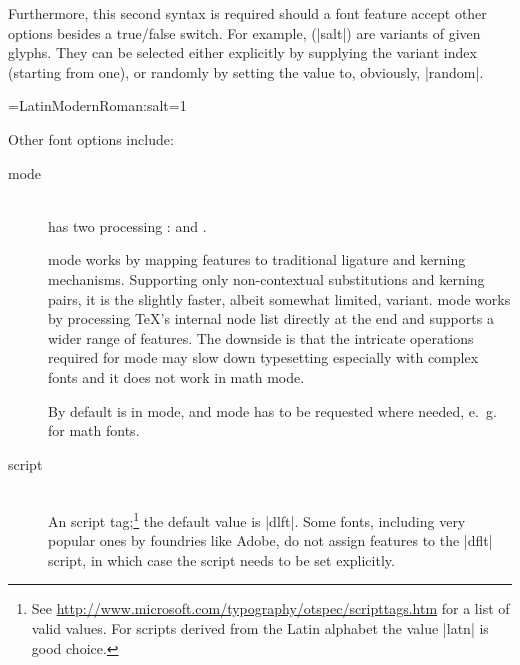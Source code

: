 \noindent
Furthermore, this second syntax is required should a font feature
accept other options besides a true/false switch.
%
For example,  (|salt|) are variants of
given glyphs.
%
They can be selected either explicitly by supplying the variant
index (starting from one), or randomly by setting the value to,
obviously, |random|.

\beginlisting
  \font\librmsaltfirst=LatinModernRoman:salt=1
\endlisting

\noindent Other font options include:

\begin{description}

\item [mode] \hfill \\
        has two \OpenType processing
       :
        and .

        mode works by mapping \OpenType
       features to traditional \TEX ligature and kerning mechanisms.
       Supporting only non-contextual substitutions and kerning
       pairs, it is the slightly faster, albeit somewhat limited, variant.
        mode works by processing \TeX’s internal
       node list directly at the \LUA end and supports
       a wider range of \OpenType features.
       The downside is that the intricate operations required for
        mode may slow down typesetting especially
       with complex fonts and it does not work in math mode.

       By default  is in 
       mode, and  mode has to be requested where needed,
       e.~g. for math fonts.

\item [script] \label{script-tag} \hfill \\
       An \OpenType script tag;\footnote{%
         See \url{http://www.microsoft.com/typography/otspec/scripttags.htm}
         for a list of valid values.
         For scripts derived from the Latin alphabet the value
         |latn| is good choice.
       }
       the default value is |dlft|.
       Some fonts, including very popular ones by foundries like Adobe,
       do not assign features to the |dflt| script, in
       which case the script needs to be set explicitly.


\end{description}
